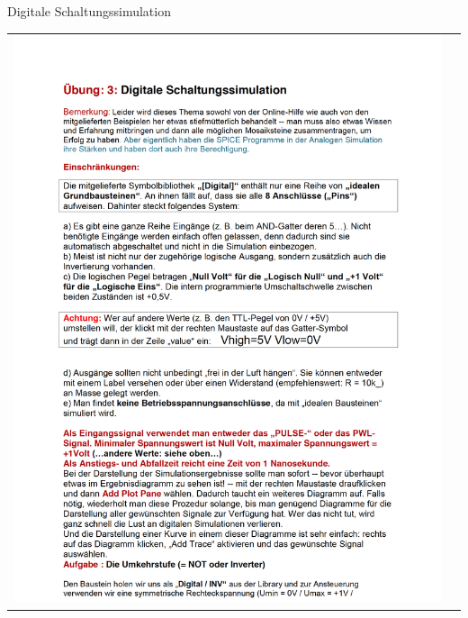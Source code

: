 \begin{frame}[t]{Digitale Schaltungssimulation} 
    
    \begin{spacing}{0.9} \begin{tiny}
      \begin{table}[h!]
        \begin{tabular}{p{5cm} p{5cm}}
            \begin{minipage}{0.5\textwidth}                
                \includegraphics[width=\linewidth]{pictures/legacy/digi_1.png}
            \end{minipage} 
            &
            \begin{minipage}{0.5\textwidth}

\end{minipage}
\end{tabular}
\end{table}
\end{tiny}
\end{spacing}
\end{frame}

